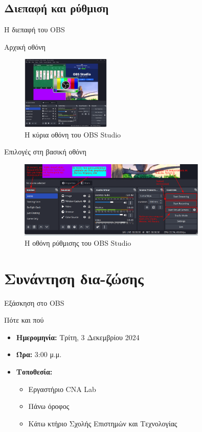 \documentclass[aspectratio=169]{beamer}
\begin{document}
\subsection{Διεπαφή και ρύθμιση}
\begin{frame}[allowframebreaks]{Η διεπαφή του OBS}
  \begin{block}{Αρχική οθόνη}
    \begin{figure}
      \includegraphics[width=0.38\textwidth]{images/screenshot_obs.png}
      \caption{Η κύρια οθόνη του OBS Studio}
      \label{fig:obs_interface}
    \end{figure}
  \end{block}
  \begin{block}{Επιλογές στη βασική οθόνη}
    \begin{figure}
      \includegraphics[width=0.8\textwidth]{images/obs_tools.png}
      \caption{Η οθόνη ρύθμισης του OBS Studio}
      \label{fig:obs_interface2}
    \end{figure}
  \end{block}
\end{frame}
\section{Συνάντηση δια-ζώσης}
\begin{frame}{Εξάσκηση στο OBS}
  \begin{block}{Πότε και πού}
    \begin{itemize}
      \item \textbf{Ημερομηνία:} Τρίτη, 3 Δεκεμβρίου 2024
      \item \textbf{Ώρα:} 3:00 μ.μ.
      \item \textbf{Τοποθεσία:}
        \begin{itemize}
          \item Εργαστήριο CNA Lab
          \item Πάνω όροφος
          \item Κάτω κτήριο Σχολής Επιστημών και Τεχνολογίας
        \end{itemize}
    \end{itemize}
  \end{block}
\end{frame}
\end{document}
